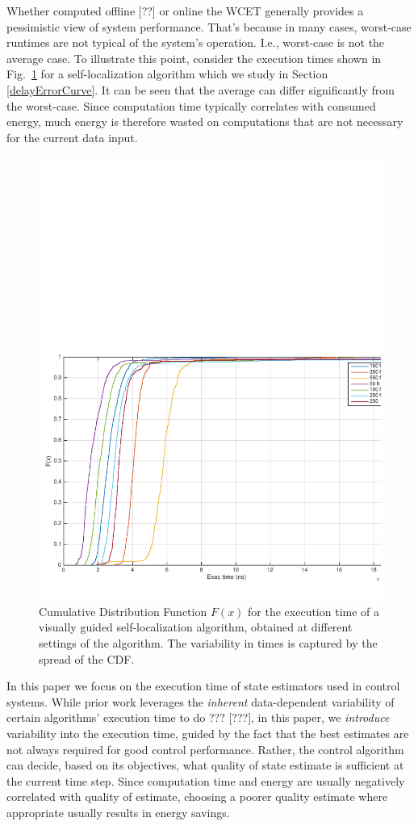 Whether computed offline [??] or online \cite{hendsethB12_OnlineWCET} the WCET generally provides a pessimistic view of system performance.
That's because in many cases, worst-case runtimes are not typical of the system's operation. 
I.e., worst-case is not the average case. 
To illustrate this point, consider the execution times shown in Fig.~\ref{fig:time_ecdf} for a self-localization algorithm which we study in Section \ref{delayErrorCurve}.
It can be seen that the average can differ significantly from the worst-case.
Since computation time typically correlates with consumed energy, much energy is therefore wasted on computations that are not necessary for the current data input.
\begin{figure}[t]
\centering
\includegraphics[width=0.7\linewidth]{figures/time_ecdf}
\caption{Cumulative Distribution Function $F(x)$ for the execution time of a visually guided self-localization algorithm, obtained at different settings of the algorithm. The variability in times is captured by the spread of the CDF.}
\label{fig:time_ecdf}
\end{figure}

In this paper we focus on the execution time of state estimators used in control systems.
While prior work leverages the \emph{inherent} data-dependent variability of certain algorithms' execution time to do ??? [???], in this paper, we \emph{introduce} variability into the execution time, guided by the fact that the best estimates are not always required for good control performance.
Rather, the control algorithm can decide, based on its objectives, what quality of state estimate is sufficient at the current time step.
Since computation time and energy are usually negatively correlated with quality of estimate, choosing a poorer quality estimate where appropriate usually results in energy savings.

